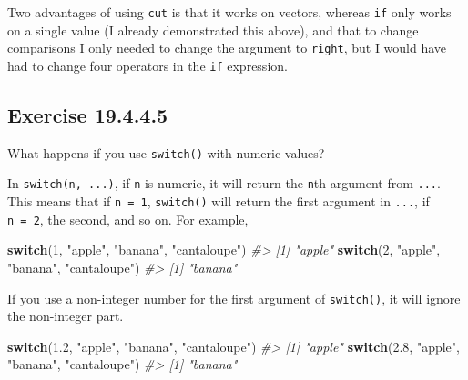 \documentclass[]{book}
\newenvironment{Shaded}{\begin{snugshade}}{\end{snugshade}}
\newcommand{\CommentTok}[1]{\textcolor[rgb]{0.56,0.35,0.01}{\textit{#1}}}
\newcommand{\ControlFlowTok}[1]{\textcolor[rgb]{0.13,0.29,0.53}{\textbf{#1}}}
\newcommand{\DecValTok}[1]{\textcolor[rgb]{0.00,0.00,0.81}{#1}}
\newcommand{\FloatTok}[1]{\textcolor[rgb]{0.00,0.00,0.81}{#1}}
\newcommand{\NormalTok}[1]{#1}
\newcommand{\StringTok}[1]{\textcolor[rgb]{0.31,0.60,0.02}{#1}}
\theoremstyle{plain}
\theoremstyle{remark}
\begin{document}
Two advantages of using \texttt{cut} is that it works on vectors, whereas \texttt{if} only works on a single value (I already demonstrated this above),
and that to change comparisons I only needed to change the argument to \texttt{right}, but I would have had to change four operators in the \texttt{if} expression.

\hypertarget{exercise-19.4.4.5}{%
\subsection*{\texorpdfstring{Exercise {19.4.4.5}}{Exercise 19.4.4.5}}\label{exercise-19.4.4.5}}

What happens if you use \texttt{switch()} with numeric values?

In \texttt{switch(n,\ ...)}, if \texttt{n} is numeric, it will return the \texttt{n}th argument from \texttt{...}.
This means that if \texttt{n\ =\ 1}, \texttt{switch()} will return the first argument in \texttt{...},
if \texttt{n\ =\ 2}, the second, and so on.
For example,

\begin{Shaded}
\begin{Highlighting}[]
\ControlFlowTok{switch}\NormalTok{(}\DecValTok{1}\NormalTok{, }\StringTok{"apple"}\NormalTok{, }\StringTok{"banana"}\NormalTok{, }\StringTok{"cantaloupe"}\NormalTok{)}
\CommentTok{#> [1] "apple"}
\ControlFlowTok{switch}\NormalTok{(}\DecValTok{2}\NormalTok{, }\StringTok{"apple"}\NormalTok{, }\StringTok{"banana"}\NormalTok{, }\StringTok{"cantaloupe"}\NormalTok{)}
\CommentTok{#> [1] "banana"}
\end{Highlighting}
\end{Shaded}

If you use a non-integer number for the first argument of \texttt{switch()}, it will
ignore the non-integer part.

\begin{Shaded}
\begin{Highlighting}[]
\ControlFlowTok{switch}\NormalTok{(}\FloatTok{1.2}\NormalTok{, }\StringTok{"apple"}\NormalTok{, }\StringTok{"banana"}\NormalTok{, }\StringTok{"cantaloupe"}\NormalTok{)}
\CommentTok{#> [1] "apple"}
\ControlFlowTok{switch}\NormalTok{(}\FloatTok{2.8}\NormalTok{, }\StringTok{"apple"}\NormalTok{, }\StringTok{"banana"}\NormalTok{, }\StringTok{"cantaloupe"}\NormalTok{)}
\CommentTok{#> [1] "banana"}
\end{Highlighting}
\end{Shaded}
\end{document}
